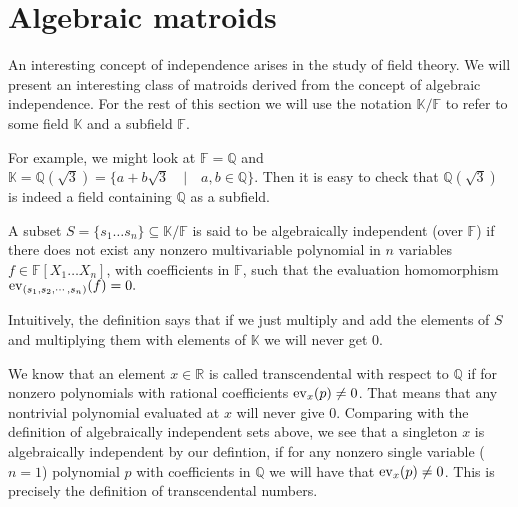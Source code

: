 \section{Algebraic matroids}

An interesting concept of independence arises in the study of field theory. We will present an interesting class of matroids derived from the concept of algebraic independence. For the rest of this section we will use the notation $\mathbb K / \mathbb F$ to refer to some field $\mathbb K$ and a subfield $\mathbb F$.


\begin{exmp}
    For example, we might look at $\mathbb{F} = \mathbb{Q}$ and $\mathbb{K} = \mathbb{Q}(
        \sqrt{3})  = \{a + b\sqrt{3}\quad |\quad a,b \in \mathbb{Q}\}$. Then it is easy to check that $\mathbb{Q}(\sqrt{3})$ is indeed a field containing $\mathbb{Q}$ as a subfield. 
\end{exmp}

\begin{defn}
	A subset $S = \{ s_1 \ldots s _n \} \subseteq \mathbb K / \mathbb F$ is said to be algebraically independent (over $\mathbb F$) if there does not exist any
	nonzero multivariable polynomial in $n$ variables $f \in \mathbb{F}[X _1 \ldots X _n]$, with coefficients in $\mathbb{F} $, such that the evaluation homomorphism $\mathrm{ev}_{(s_1, s_2,\cdots,s_n)}(f) = 0.$
\end{defn}
Intuitively, the definition says that if we just multiply and add the elements of $S$ and multiplying them with elements of $\mathbb{K}$ we will never get 0.



We know that an element $x\in \mathbb{R}$ is called transcendental with respect to $\mathbb{Q}$ if for nonzero polynomials with rational coefficients $\mathrm{ev}_{x}(p) \neq 0$. That means that any nontrivial polynomial evaluated at $x$ will never give 0.
Comparing with the definition of algebraically independent sets above, we see that a singleton ${x}$ is algebraically independent by our defintion, if for any nonzero  single variable ($n = 1$) polynomial $p$ with coefficients in $\mathbb{Q}$ we will have that $\mathrm{ev}_{x}(p) \neq 0$. This is precisely the definition of transcendental numbers.



